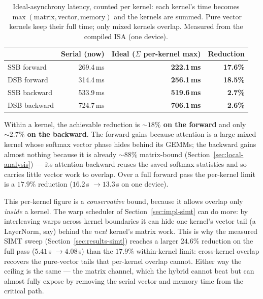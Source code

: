\documentclass[11pt]{report}
\begin{document}
\begin{table}[h]
\centering
\caption{Ideal-asynchrony latency, counted per kernel: each kernel's time
becomes $\max(\text{matrix},\text{vector},\text{memory})$ and the kernels are
summed. Pure vector kernels keep their full time; only mixed kernels overlap.
Measured from the compiled ISA (one device).}
\label{tab:ideal-async}
\begin{tabular}{@{}lrrr@{}}
\toprule
& Serial (now) & Ideal ($\Sigma$ per-kernel max) & Reduction \\
\midrule
SSB forward & 269.4\,ms & \textbf{222.1\,ms} & \textbf{17.6\%} \\
DSB forward & 314.4\,ms & \textbf{256.1\,ms} & \textbf{18.5\%} \\
SSB backward & 533.9\,ms & \textbf{519.6\,ms} & \textbf{2.7\%} \\
DSB backward & 724.7\,ms & \textbf{706.1\,ms} & \textbf{2.6\%} \\
\bottomrule
\end{tabular}
\end{table}

Within a kernel, the achievable reduction is \textbf{${\sim}18\%$ on the
forward} and only \textbf{${\sim}2.7\%$ on the backward}. The forward gains
because attention is a large mixed kernel whose softmax vector phase hides
behind its GEMMs; the backward gains almost nothing because it is already
${\sim}88\%$ matrix-bound (Section~\ref{sec:local-analysis}) --- its attention
backward reuses the saved softmax statistics and so carries little vector work
to overlap. Over a full forward pass the per-kernel limit is a $17.9\%$
reduction ($16.2$\,s $\to 13.3$\,s on one device).

This per-kernel figure is a \emph{conservative} bound, because it allows
overlap only \emph{inside} a kernel. The warp scheduler of
Section~\ref{sec:impl-simt} can do more: by interleaving warps across kernel
boundaries it can hide one kernel's vector tail (a LayerNorm, say) behind the
\emph{next} kernel's matrix work. This is why the measured SIMT sweep
(Section~\ref{sec:results-simt}) reaches a larger $24.6\%$ reduction on the
full pass ($5.41$\,s $\to 4.08$\,s) than the $17.9\%$ within-kernel limit:
cross-kernel overlap recovers the pure-vector tails that per-kernel overlap
cannot. Either way the ceiling is the same --- the matrix channel, which the
hybrid cannot beat but can almost fully expose by removing the serial vector
and memory time from the critical path.
\end{document}
